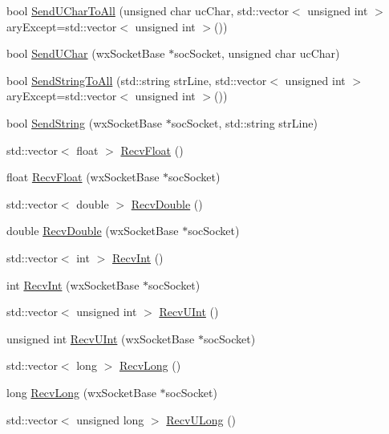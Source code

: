 \begin{DoxyCompactItemize}
\item 
bool \hyperlink{classs13_w_x_w_server_af6123eed42ae7cbd055b2d451b440250}{Send\+U\+Char\+To\+All} (unsigned char uc\+Char, std\+::vector$<$ unsigned int $>$ ary\+Except=std\+::vector$<$ unsigned int $>$())
\item 
bool \hyperlink{classs13_w_x_w_server_a5691b7c73ddc078e39eea1ac988b7515}{Send\+U\+Char} (wx\+Socket\+Base $\ast$soc\+Socket, unsigned char uc\+Char)
\item 
bool \hyperlink{classs13_w_x_w_server_a84bfb27995e33f246b78c9e2b991d4dd}{Send\+String\+To\+All} (std\+::string str\+Line, std\+::vector$<$ unsigned int $>$ ary\+Except=std\+::vector$<$ unsigned int $>$())
\item 
bool \hyperlink{classs13_w_x_w_server_ac87d3d8b0ba1c1a1d54b336ec12d78cc}{Send\+String} (wx\+Socket\+Base $\ast$soc\+Socket, std\+::string str\+Line)
\item 
std\+::vector$<$ float $>$ \hyperlink{classs13_w_x_w_server_aa82132b1ef2796da36aa5f05fe37f7f5}{Recv\+Float} ()
\item 
float \hyperlink{classs13_w_x_w_server_a92198cd05d812b340f17ab2a269e7fc4}{Recv\+Float} (wx\+Socket\+Base $\ast$soc\+Socket)
\item 
std\+::vector$<$ double $>$ \hyperlink{classs13_w_x_w_server_af11e92b08c086609fdd7d50cbb9eb512}{Recv\+Double} ()
\item 
double \hyperlink{classs13_w_x_w_server_ad84b6f6b4fa65757d28dc2fdb436716c}{Recv\+Double} (wx\+Socket\+Base $\ast$soc\+Socket)
\item 
std\+::vector$<$ int $>$ \hyperlink{classs13_w_x_w_server_a84c266a29b5974ec58b1da38487c0754}{Recv\+Int} ()
\item 
int \hyperlink{classs13_w_x_w_server_a510c37c61bfef1eda11ebddafdeea923}{Recv\+Int} (wx\+Socket\+Base $\ast$soc\+Socket)
\item 
std\+::vector$<$ unsigned int $>$ \hyperlink{classs13_w_x_w_server_ad788e49fb5527b8d860e6b188c2dc5e8}{Recv\+U\+Int} ()
\item 
unsigned int \hyperlink{classs13_w_x_w_server_ab4169357cf4d3068ef5eac1e397977d2}{Recv\+U\+Int} (wx\+Socket\+Base $\ast$soc\+Socket)
\item 
std\+::vector$<$ long $>$ \hyperlink{classs13_w_x_w_server_ac0c1b63ad41aab295da409e223ecb242}{Recv\+Long} ()
\item 
long \hyperlink{classs13_w_x_w_server_ac18b07e1eb76db6279d3c759d8145b59}{Recv\+Long} (wx\+Socket\+Base $\ast$soc\+Socket)
\item 
std\+::vector$<$ unsigned long $>$ \hyperlink{classs13_w_x_w_server_ae3d9f99f769e3a62f9c0c013f4f884cb}{Recv\+U\+Long} ()

\end{DoxyCompactItemize}
